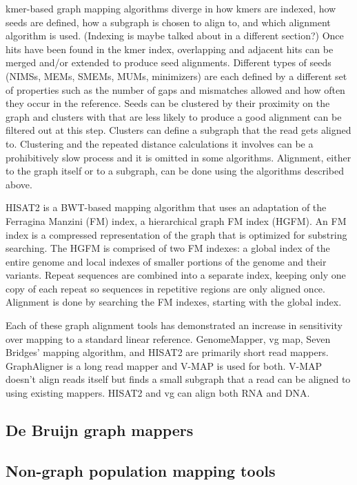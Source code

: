 kmer-based graph mapping algorithms diverge in how kmers are indexed, how seeds are defined, how a subgraph is chosen to align to, and which alignment algorithm is used.
(Indexing is maybe talked about in a different section?)
Once hits have been found in the kmer index, overlapping and adjacent hits can be merged and/or extended to produce seed alignments.
Different types of seeds (NIMSs, MEMs, SMEMs, MUMs, minimizers) are each defined by a different set of properties such as the number of gaps and mismatches allowed and how often they occur in the reference.
Seeds can be clustered by their proximity on the graph and clusters with that are less likely to produce a good alignment can be filtered out at this step.
Clusters can define a subgraph that the read gets aligned to.
Clustering and the repeated distance calculations it involves can be a prohibitively slow process and it is omitted in some algorithms.
Alignment, either to the graph itself or to a subgraph, can be done using the algorithms described above.

HISAT2 is a BWT-based mapping algorithm that uses an adaptation of the Ferragina Manzini (FM) index, a hierarchical graph FM index (HGFM).
An FM index is a compressed representation of the graph that is optimized for substring searching.
The HGFM is comprised of two FM indexes: a global index of the entire genome and local indexes of smaller portions of the genome and their variants.
Repeat sequences are combined into a separate index, keeping only one copy of each repeat so sequences in repetitive regions are only aligned once.
Alignment is done by searching the FM indexes, starting with the global index.


Each of these graph alignment tools has demonstrated an increase in sensitivity over mapping to a standard linear reference.
GenomeMapper, vg map, Seven Bridges' mapping algorithm, and HISAT2 are primarily short read mappers.
GraphAligner is a long read mapper and V-MAP is used for both.
V-MAP doesn't align reads itself but finds a small subgraph that a read can be aligned to using existing mappers. 
HISAT2 and vg can align both RNA and DNA.


\subsection{De Bruijn graph mappers}

\subsection{Non-graph population mapping tools}

